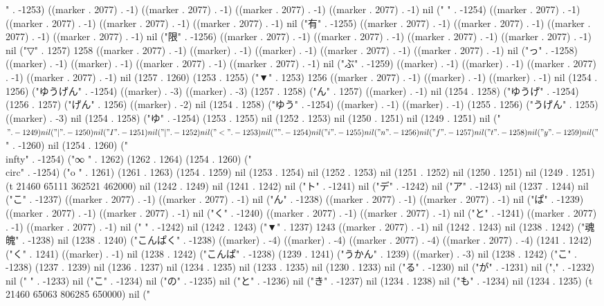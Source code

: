 {" . -1253) ((marker . 2077) . -1) ((marker . 2077) . -1) ((marker . 2077) . -1) ((marker . 2077) . -1) nil (" " . -1254) ((marker . 2077) . -1) ((marker . 2077) . -1) ((marker . 2077) . -1) ((marker . 2077) . -1) nil ("有" . -1255) ((marker . 2077) . -1) ((marker . 2077) . -1) ((marker . 2077) . -1) ((marker . 2077) . -1) nil ("限" . -1256) ((marker . 2077) . -1) ((marker . 2077) . -1) ((marker . 2077) . -1) ((marker . 2077) . -1) nil ("▽" . 1257) 1258 ((marker . 2077) . -1) ((marker) . -1) ((marker) . -1) ((marker . 2077) . -1) ((marker . 2077) . -1) nil ("っ" . -1258) ((marker) . -1) ((marker) . -1) ((marker . 2077) . -1) ((marker . 2077) . -1) nil ("ぶ" . -1259) ((marker) . -1) ((marker) . -1) ((marker . 2077) . -1) ((marker . 2077) . -1) nil (1257 . 1260) (1253 . 1255) ("▼" . 1253) 1256 ((marker . 2077) . -1) ((marker) . -1) ((marker) . -1) nil (1254 . 1256) ("ゆうげん" . -1254) ((marker) . -3) ((marker) . -3) (1257 . 1258) ("ん" . 1257) ((marker) . -1) nil (1254 . 1258) ("ゆうげ" . -1254) (1256 . 1257) ("げん" . 1256) ((marker) . -2) nil (1254 . 1258) ("ゆう" . -1254) ((marker) . -1) ((marker) . -1) (1255 . 1256) ("うげん" . 1255) ((marker) . -3) nil (1254 . 1258) ("ゆ" . -1254) (1253 . 1255) nil (1252 . 1253) nil (1250 . 1251) nil (1249 . 1251) nil ("$" . -1249) nil ("|" . -1250) nil ("I" . -1251) nil ("|" . -1252) nil ("<" . -1253) nil ("\\" . -1254) nil ("i" . -1255) nil ("n" . -1256) nil ("f" . -1257) nil ("t" . -1258) nil ("y" . -1259) nil ("$" . -1260) nil (1254 . 1260) ("\\infty" . -1254) ("∞
" . 1262) (1262 . 1264) (1254 . 1260) ("\\circ" . -1254) ("o
" . 1261) (1261 . 1263) (1254 . 1259) nil (1253 . 1254) nil (1252 . 1253) nil (1251 . 1252) nil (1250 . 1251) nil (1249 . 1251) (t 21460 65111 362521 462000) nil (1242 . 1249) nil (1241 . 1242) nil ("ト" . -1241) nil ("デ" . -1242) nil ("ア" . -1243) nil (1237 . 1244) nil ("こ" . -1237) ((marker . 2077) . -1) ((marker . 2077) . -1) nil ("ん" . -1238) ((marker . 2077) . -1) ((marker . 2077) . -1) nil ("ぱ" . -1239) ((marker . 2077) . -1) ((marker . 2077) . -1) nil ("く" . -1240) ((marker . 2077) . -1) ((marker . 2077) . -1) nil ("と" . -1241) ((marker . 2077) . -1) ((marker . 2077) . -1) nil (" " . -1242) nil (1242 . 1243) ("▼" . 1237) 1243 ((marker . 2077) . -1) nil (1242 . 1243) nil (1238 . 1242) ("魂魄" . -1238) nil (1238 . 1240) ("こんぱく" . -1238) ((marker) . -4) ((marker) . -4) ((marker . 2077) . -4) ((marker . 2077) . -4) (1241 . 1242) ("く" . 1241) ((marker) . -1) nil (1238 . 1242) ("こんぱ" . -1238) (1239 . 1241) ("うかん" . 1239) ((marker) . -3) nil (1238 . 1242) ("こ" . -1238) (1237 . 1239) nil (1236 . 1237) nil (1234 . 1235) nil (1233 . 1235) nil (1230 . 1233) nil ("る" . -1230) nil ("が" . -1231) nil ("," . -1232) nil (" " . -1233) nil ("こ" . -1234) nil ("の" . -1235) nil ("と" . -1236) nil ("き" . -1237) nil (1234 . 1238) nil ("も" . -1234) nil (1234 . 1235) (t 21460 65063 806285 650000) nil ("
}
